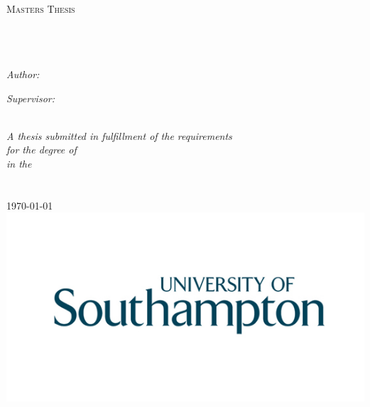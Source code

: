 \documentclass[
11pt, %
english, %
singlespacing, %
headsepline, %
]{MastersDoctoralThesis} %
\author{Alun \textsc{Meredith}} %
\begin{document}
\frontmatter %

\pagestyle{plain} %


\begin{titlepage}
\begin{center}

\textsc{\LARGE \univname}\\[1.5cm] %
\textsc{\Large Masters Thesis}\\[0.5cm] %

\HRule \\[0.4cm] %
{\huge \bfseries \ttitle}\\[0.4cm] %
\HRule \\[1.5cm] %
 
\begin{minipage}{0.4\textwidth}
\begin{flushleft} \large
\emph{Author:}\\
{\authorname} %
\end{flushleft}
\end{minipage}
\begin{minipage}{0.4\textwidth}
\begin{flushright} \large
\emph{Supervisor:} \\
{\supname} %
\end{flushright}
\end{minipage}\\[3cm]
 
\large \textit{A thesis submitted in fulfillment of the requirements\\ for the degree of \degreename}\\[0.3cm] %
\textit{in the}\\[0.4cm]
\groupname\\\deptname\\[2cm] %
 
{\large \today}\\[4cm] %
\includegraphics[width = 0.3\linewidth]{Figures/southamptonLogo} %

\pagebreak
\end{center}
\end{titlepage}
\end{document}
